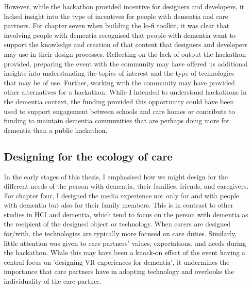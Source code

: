 However, while the hackathon provided incentive for designers and developers, it lacked insight into the type of incentives for people with dementia and care partners. For chapter seven when building the lo-fi toolkit, it was clear that involving people with dementia recognised that people with dementia want to support the knowledge and creation of that content that designers and developers may use in their design processes. Reflecting on the lack of output the hackathon provided, preparing the event with the community may have offered us additional insights into understanding the topics of interest and the type of technologies that may be of use. Further, working with the community may have provided other alternatives for a hackathon. While I intended to understand hackathons in the dementia context, the funding provided this opportunity could have been used to support engagement between schools and care homes or contribute to funding to maintain dementia communities that are perhaps doing more for dementia than a public hackathon. 

\subsection{Designing for the ecology of care}
\label{R4:EcologyOfCare}
In the early stages of this thesis, I emphasised how we might design for the different needs of the person with dementia, their families, friends, and caregivers. For chapter four, I designed the media experience not only for and with people with dementia but also for their family members. This is in contrast to other studies in HCI and dementia, which tend to focus on the person with dementia as the recipient of the designed object or technology. When carers are designed for/with, the technologies are typically more focused on care duties. Similarly, little attention was given to care partners' values, expectations, and needs during the hackathon. While this may have been a knock-on effect of the event having a central focus on 'designing VR experiences for dementia', it undermines the importance that care partners have in adopting technology and overlooks the individuality of the care partner.

